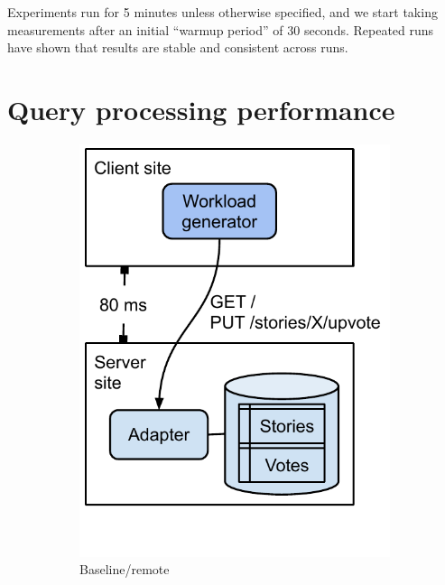 Experiments run for 5 minutes unless otherwise specified, and we start taking measurements after an initial
``warmup period'' of 30 seconds.
Repeated runs have shown that results are stable and consistent across runs.


\section{Query processing performance}
\label{sec:eval_query_processing_perf}

\begin{figure}[H]
        \centering
        \begin{subfigure}[b]{0.24\textwidth}
            \centering
            \includegraphics[width=\textwidth]{./figures/evaluation/evaluation_deployments_baseline_remote.pdf}
            \caption{Baseline/remote}
            \label{fig:deployments_baseline_remote}
        \end{subfigure}
        \hfill
        \begin{subfigure}[b]{0.24\textwidth}

\end{subfigure}
\end{figure}
